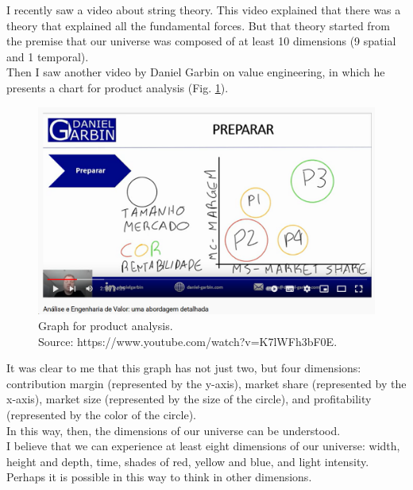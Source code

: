 \documentclass{book}
\begin{document}
I recently saw a video about string theory. This video explained that there was a theory that explained all the fundamental forces. But that theory started from the premise that our universe was composed of at least 10 dimensions (9 spatial and 1 temporal). \\

Then I saw another video by Daniel Garbin on value engineering, in which he presents a chart for product analysis (Fig. \ref{fig:productAnalisys}). 

\begin{figure}[h]
	\begin{center}
	    \caption{Graph for product analysis. \\ Source: https://www.youtube.com/watch?v=K7lWFh3bF0E.}
		\label{fig:productAnalisys}
		\centering
		\includegraphics[width=\textwidth]{figures/productSelection.png}
	\end{center}
\end{figure}

It was clear to me that this graph has not just two, but four dimensions: contribution margin (represented by the y-axis), market share (represented by the x-axis), market size (represented by the size of the circle), and profitability (represented by the color of the circle). \\

In this way, then, the dimensions of our universe can be understood. \\

I believe that we can experience at least eight dimensions of our universe: width, height and depth, time, shades of red, yellow and blue, and light intensity. \\

Perhaps it is possible in this way to think in other dimensions.
\end{document}
